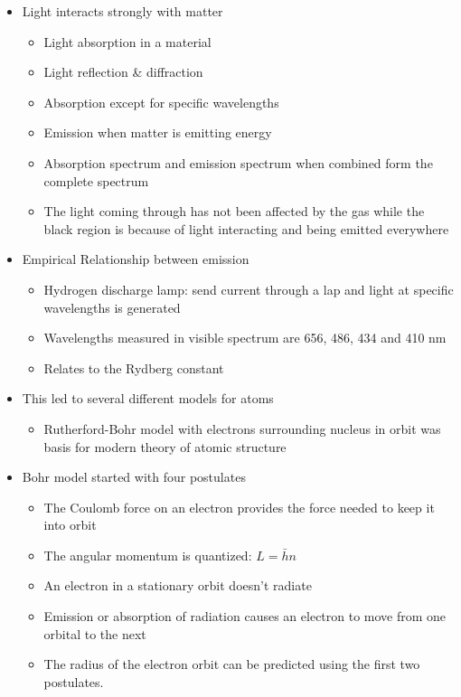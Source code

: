 \documentclass[12pt]{article}
\begin{document}
\begin{itemize}
    \item Light interacts strongly with matter \begin{itemize}
        \item Light absorption in a material
        \item Light reflection \& diffraction
        \item Absorption except for specific wavelengths
        \item Emission when matter is emitting energy
        \item Absorption spectrum and emission spectrum when combined form the complete spectrum
        \item The light coming through has not been affected by the gas while the black region is because of light interacting and being emitted everywhere
    \end{itemize}
    \item Empirical Relationship between emission \begin{itemize}
        \item Hydrogen discharge lamp: send current through a lap and light at specific wavelengths is generated
        \item Wavelengths measured in visible spectrum are 656, 486, 434 and 410 nm
        \item Relates to the Rydberg constant
    \end{itemize}
    \item This led to several different models for atoms \begin{itemize}
        \item Rutherford-Bohr model with electrons surrounding nucleus in orbit was basis for modern theory of atomic structure
    \end{itemize}
    \item Bohr model started with four postulates \begin{itemize}
        \item The Coulomb force on an electron provides the force needed to keep it into orbit
        \item The angular momentum is quantized: $L = \bar{h}n$
        \item An electron in a stationary orbit doesn't radiate
        \item Emission or absorption of radiation causes an electron to move from one orbital to the next
        \item The radius of the electron orbit can be predicted using the first two postulates. 

\end{itemize}
\end{itemize}
\end{document}
